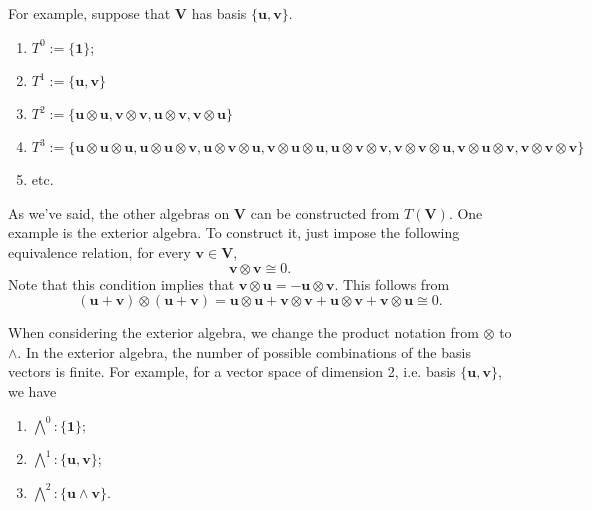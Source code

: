 For example, suppose that $\mathbf V$ has basis $\{\mathbf u, \mathbf v\}$.
\begin{enumerate}
	\item $T^0 := \{\mathbf 1\}$;
	\item $T^1 := \{\mathbf u, \mathbf v\}$
	\item $T^2 := \{\mathbf u \otimes \mathbf u,
		      \mathbf v \otimes \mathbf v,
		      \mathbf u \otimes \mathbf v,
		      \mathbf v \otimes \mathbf u
		      \}$
	\item $T^3 := \{
		      \mathbf u \otimes \mathbf u \otimes \mathbf u,
		      \mathbf u \otimes \mathbf u \otimes \mathbf v,
		      \mathbf u \otimes \mathbf v \otimes \mathbf u,
		      \mathbf v \otimes \mathbf u \otimes \mathbf u,
		      \mathbf u \otimes \mathbf v \otimes \mathbf v,
		      \mathbf v \otimes \mathbf v \otimes \mathbf u,
		      \mathbf v \otimes \mathbf u \otimes \mathbf v,
		      \mathbf v \otimes \mathbf v \otimes \mathbf v
		      \}$
	\item etc.
\end{enumerate}

As we've said, the other algebras on $\mathbf V$ can be constructed
from $T(\mathbf V)$. One example is the exterior algebra.
To construct it, just impose the following equivalence relation,
for every $\mathbf v \in \mathbf V$,
\begin{displaymath}
	\mathbf{v} \otimes \mathbf{v} \cong 0.
\end{displaymath}
Note that this condition implies that
$\mathbf {v} \otimes \mathbf {u} = - \mathbf{u} \otimes \mathbf{v}$. This follows
from
\begin{displaymath}
	(\mathbf u + \mathbf v) \otimes
	(\mathbf u + \mathbf v) =
	\mathbf u \otimes \mathbf u
	+
	\mathbf v \otimes \mathbf v
	+
	\mathbf u \otimes \mathbf v
	+
	\mathbf v \otimes \mathbf u \cong 0.
\end{displaymath}

When considering the exterior algebra, we change the product
notation from $\otimes$ to $\wedge$. In the exterior algebra,
the number of possible combinations of the basis vectors is finite.
For example, for a vector space of dimension 2, i.e. basis
$\{\mathbf u, \mathbf v\}$, we have
\begin{enumerate}
	\item $\bigwedge^0 : \{\mathbf 1\}$;
	\item $\bigwedge^1 : \{\mathbf u, \mathbf v\}$;
	\item $\bigwedge^2 : \{\mathbf u \wedge \mathbf v\}$.
\end{enumerate}

